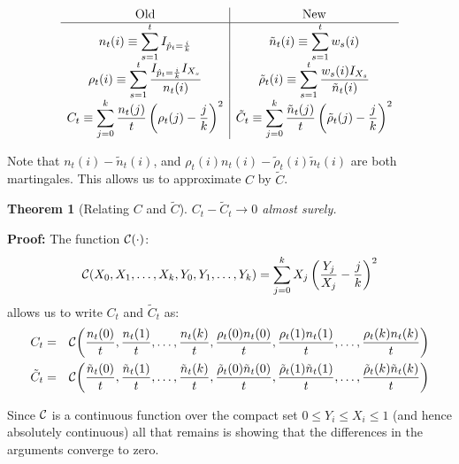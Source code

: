\documentclass{book}
\newtheorem{theorem}{Theorem}[chapter]
\begin{document}
\begin{equation} %
\begin{array}{c|c}
\hbox{Old} & \hbox{New} \\ \hline
\displaystyle
n_t(i) \equiv \sum_{s=1}^{t} I_{\hat{p}_t=\frac{i}{k}} & 
\displaystyle
\tilde{n}_t(i) \equiv \sum_{s=1}^{t} w_s(i) \\
\displaystyle
\rho_t(i) \equiv \sum_{s=1}^{t}
        \frac{I_{\hat{p}_t=\frac{i}{k}}I_{X_s}}{n_t(i)} &
\displaystyle
\tilde{\rho}_t(i) \equiv \sum_{s=1}^{t}
        \frac{w_s(i)I_{X_s}}{\tilde{n}_t(i)} \\
\displaystyle
C_t \equiv \sum_{j=0}^k \frac{n_t(j)}{t}
        \left(\rho_t(j) - \frac{j}{k} \right)^2 &
\displaystyle
\tilde{C}_t \equiv \sum_{j=0}^k \frac{\tilde{n}_t(j)}{t}
        \left(\tilde{\rho}_t(j) - \frac{j}{k} \right)^2
\end{array}
\end{equation}

Note that $n_t(i) - \tilde{n}_t(i)$, and $\rho_t(i)n_t(i) -
\tilde{\rho}_t(i)\tilde{n}_t(i)$ are both martingales.  This allows
us to approximate $C$ by $\tilde{C}$.

\begin{theorem}[Relating $C$ and $\tilde{C}$] $C_t - \tilde{C}_t
  \rightarrow 0$ almost surely.  
\end{theorem}

{\bf Proof:} The function ${\cal C}(\cdot)$:
\begin{equation}{\cal C}(X_0,X_1,\ldots,X_k,Y_0,Y_1,\ldots,Y_k) =
  \sum_{j=0}^k X_j \left(\frac{Y_j}{X_j} - \frac{j}{k}\right)^2
\end{equation}
allows us to write $C_t$ and $\tilde{C}_t$ as:
\begin{eqnarray*} %
 C_t& =& {\cal C}\!\left(\frac{n_t(0)}{t}, \frac{n_t(1)}{t}, \ldots,
\frac{n_t(k)}{t}, \frac{\rho_t(0)n_t(0)}{t}, \frac{\rho_t(1)n_t(1)}{t},
\ldots, \frac{\rho_t(k)n_t(k)}{t}\right) \\
\tilde{C}_t& =& {\cal C}\!\left(\frac{\tilde{n}_t(0)}{t},
\frac{\tilde{n}_t(1)}{t}, \ldots, \frac{\tilde{n}_t(k)}{t}, 
\frac{\tilde{\rho}_t(0)\tilde{n}_t(0)}{t},
\frac{\tilde{\rho}_t(1)\tilde{n}_t(1)}{t}, \ldots, 
\frac{\tilde{\rho}_t(k)\tilde{n}_t(k)}{t}\right)
\end{eqnarray*}

Since ${\cal C}$ is a continuous function over the compact set $0 \le
Y_i \le X_i \le 1$ (and hence absolutely continuous) all that remains
is showing that the differences in the arguments converge to zero. 
\end{document}
